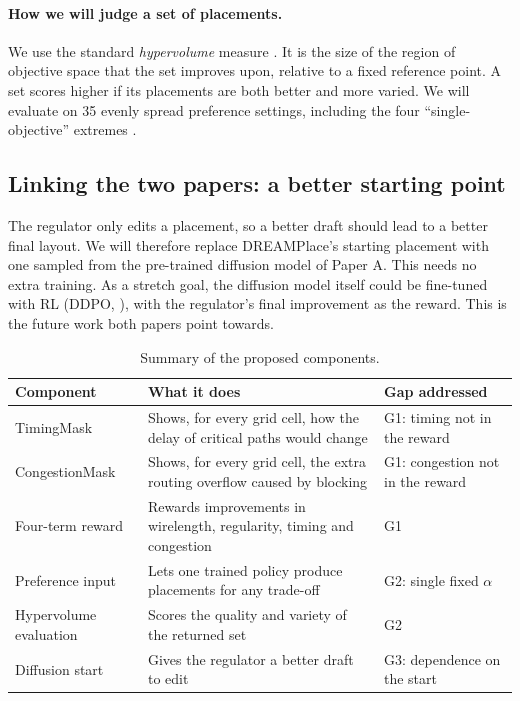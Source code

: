 \documentclass{article}
\begin{document}
\paragraph{How we will judge a set of placements.} We use the standard \emph{hypervolume} measure
\citep{zitzler1999hv}. It is the size of the region of objective space that the set improves upon,
relative to a fixed reference point. A set scores higher if its placements are both better and more
varied. We will evaluate on 35 evenly spread preference settings, including the four
``single-objective'' extremes \citep{das1998nbi}.

\subsection{Linking the two papers: a better starting point}
\label{sec:g3}
The regulator only edits a placement, so a better draft should lead to a better final layout. We will
therefore replace DREAMPlace's starting placement with one sampled from the pre-trained diffusion
model of Paper A. This needs no extra training. As a stretch goal, the diffusion model itself could be
fine-tuned with RL (DDPO, \citealp{black2024ddpo}), with the regulator's final improvement as the
reward. This is the future work both papers point towards.

\begin{table}[H]
\centering
\caption{Summary of the proposed components.}
\label{tab:components}
\small
\begin{tabular}{@{}L{3.2cm}L{6.2cm}L{5.2cm}@{}}
\toprule
\textbf{Component} & \textbf{What it does} & \textbf{Gap addressed} \\
\midrule
TimingMask & Shows, for every grid cell, how the delay of critical paths would change & G1: timing not in the reward \\
CongestionMask & Shows, for every grid cell, the extra routing overflow caused by blocking & G1: congestion not in the reward \\
Four-term reward & Rewards improvements in wirelength, regularity, timing and congestion & G1 \\
Preference input & Lets one trained policy produce placements for any trade-off & G2: single fixed $\alpha$ \\
Hypervolume evaluation & Scores the quality and variety of the returned set & G2 \\
Diffusion start & Gives the regulator a better draft to edit & G3: dependence on the start \\
\bottomrule
\end{tabular}
\end{table}
\end{document}
